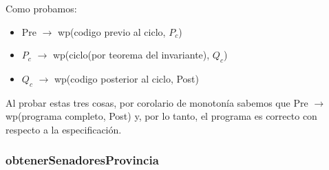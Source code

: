 \documentclass[10pt,a4paper]{article}
\begin{document}
Como probamos:
\begin{itemize}
    \item Pre $\longrightarrow$ wp(codigo previo al ciclo, $P_c$)
    \item $P_c$ $\longrightarrow$ wp(ciclo(por teorema del invariante), $Q_c$)
    \item $Q_c$ $\longrightarrow$ wp(codigo posterior al ciclo, Post)
\end{itemize}
Al probar estas tres cosas, por corolario de monotonía sabemos que Pre $\longrightarrow$ wp(programa completo, Post)
y, por lo tanto, el programa es correcto con respecto a la especificación.



\subsubsection{obtenerSenadoresProvincia}
\end{document}
